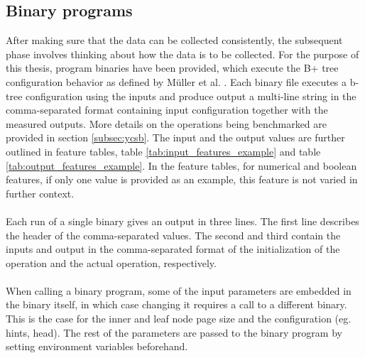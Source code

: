 \subsection{Binary programs}
After making sure that the data can be collected consistently, the subsequent phase involves thinking about how the data is to be collected. For the purpose of this thesis, program binaries have been provided, which execute the B+ tree configuration behavior as defined by Müller et al. \parencite{mueller2024}. Each binary file executes a b-tree configuration using the inputs and 
produce output a multi-line string in the comma-separated format containing input configuration together with the measured outputs. More details on the operations being benchmarked are provided in section \ref{subsec:ycsb}.
The input and the output values are further outlined in feature tables, table \ref{tab:input_features_example} and table \ref{tab:output_features_example}. In the feature tables, for numerical and boolean features, if only one value is provided as an example, this feature is not varied in further context. 
\\\\
Each run of a single binary gives an output in three lines. The first line describes the header of the comma-separated values. The second and third contain the inputs and output in the comma-separated format of the initialization of the operation and the actual operation, respectively.
\\\\
When calling a binary program, some of the input parameters are embedded in the binary itself, in which case changing it requires a call to a different binary. This is the case for the inner and leaf node page size and the configuration (eg. hints, head). The rest of the parameters are passed to the binary program by setting environment variables beforehand. 
